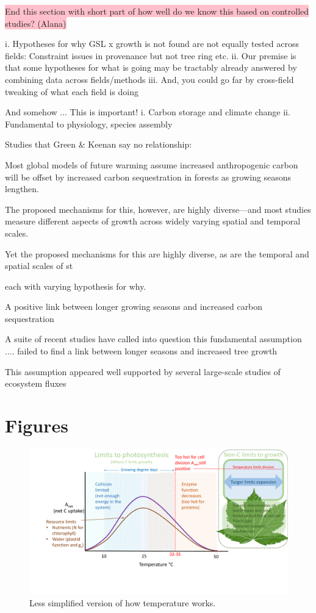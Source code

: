 \documentclass[11pt]{article}
\begin{document}
\colorbox{pink}{End this section with short part of how well do we know this based on controlled studies? (Alana)}

i. Hypotheses for why GSL x growth is not found are not equally tested across fields: Constraint issues in provenance but not tree ring etc.
ii. Our premise is that some hypotheses for what is going may be tractably already answered by combining data across fields/methods
iii. And, you could go far by cross-field tweaking of what each field is doing

And somehow ... This is important!
i. Carbon storage and climate change
ii. Fundamental to physiology, species assembly

Studies that Green \& Keenan say no relationship:

Most global models of future warming assume increased anthropogenic carbon will be offset by increased carbon sequestration in forests as growing seasons lengthen.

The proposed mechanisms for this, however, are highly diverse---and most studies measure different aspects of growth across widely varying spatial and temporal scales. 

Yet the proposed mechanisms for this are highly diverse, as are the temporal and spatial scales of st


each with varying hypothesis for why. 

A positive link between longer growing seasons and increased carbon sequestration 

A suite of recent studies have called into question this fundamental assumption .... failed to find a link between longer seasons and increased tree growth

This assumption appeared well supported by several large-scale studies of ecosystem fluxes 


\section{Figures}
\newpage
\begin{figure}[h!]
\includegraphics[width=1\textwidth]{..//figures/grephonfig.pdf}
\caption{Less simplified version of how temperature works.}
\label{fig:temperaturecomplex}
\end{figure}
\end{document}
